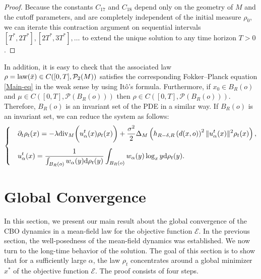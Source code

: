 \documentclass[11pt]{amsart}
\newtheorem{remark}{Remark}[section]
\def\d{\mathrm{d}}
\newcommand{\p}{o}%
\newcommand{\dist}{d}%
\begin{document}
\begin{proof}
Because the constants $C_{17}$ and $C_{18}$ depend only on the geometry of $M$ and the cutoff parameters, and are completely independent of the initial measure $\rho_0$, we can iterate this contraction argument on sequential intervals $[T^*, 2T^*], [2T^*, 3T^*], \dots$ to extend the unique solution to any   time horizon $T>0$.
\end{proof}

In addition, it is easy to check that the associated law $\rho = \textup{law}(\bar x) \in C([0,T], \mathcal P_2(M))$ satisfies the corresponding Fokker--Planck equation \eqref{Main-eq} in the weak sense by using It\^{o}'s formula. 
Furthermore, if $x_0\in B_R(\p)$ and $\mu\in C([0,T],\mathcal{P}(B_R(\p)))$ then $\rho\in C([0,T],\mathcal{P}(B_R(\p)))$. Therefore, $B_R(\p)$ is an invariant set of the PDE in a similar way. If $B_R(\p)$ is an invariant set, we can reduce the system as follows:
\begin{align*}
\begin{cases}
&\displaystyle\partial_t\rho_t(x)=-\lambda\mathrm{div}_M\bigg(u_\alpha^t(x)\rho_t(x)\bigg)+\frac{\sigma^2}{2}\Delta_M\left(h_{R-\delta, R}\left(\dist(x, \p)\right)^2\|u_\alpha^t(x)\|^2\rho_t(x)\right),\vspace{0.3cm}\\
&\displaystyle u_\alpha^t(x)=\frac{1}{\int_{B_R(\p)}w_\alpha(y)\d \rho_t(y)}\int_{B_R(\p)}w_\alpha(y)\log_xy\d \rho_t(y).
\end{cases}
\end{align*}




\section{Global Convergence} \label{sec:4}
\setcounter{equation}{0}

In this section, we present our main result about the global convergence of the CBO dynamics in a mean-field law for the objective function $\mathcal E$.  In the previous section, the well-posedness of the mean-field dynamics was established. We now turn to the long-time behavior of the solution. The goal of this section is to show that for a sufficiently large $\alpha$, the law $\rho_t$ concentrates around a global minimizer $x^*$ of the objective function $\mathcal E$. The proof consists of four steps. \\
\end{document}

